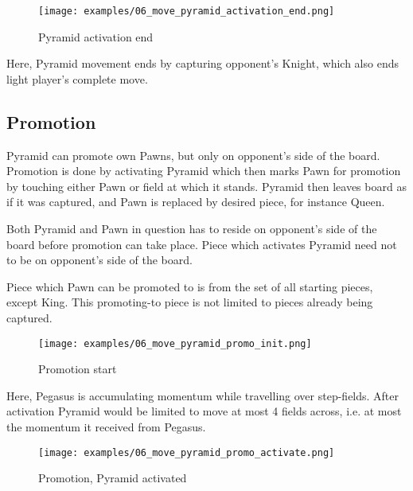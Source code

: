 \noindent
\begin{figure}[!h]
\texttt{[image: examples/06\_move\_pyramid\_activation\_end.png]}
\caption{Pyramid activation end}
\label{fig:ma_activation_end}
\end{figure}

Here, Pyramid movement ends by capturing opponent's Knight, which also ends light
player's complete move.

\clearpage %

\subsection*{Promotion}

Pyramid can promote own Pawns, but only on opponent's side of the board.
Promotion is done by activating Pyramid which then marks Pawn for promotion
by touching either Pawn or field at which it stands. Pyramid then leaves
board as if it was captured, and Pawn is replaced by desired piece, for
instance Queen.

Both Pyramid and Pawn in question has to reside on opponent's side of the
board before promotion can take place. Piece which activates Pyramid need
not to be on opponent's side of the board.

Piece which Pawn can be promoted to is from the set of all starting pieces,
except King. This promoting-to piece is not limited to pieces already being
captured.

\clearpage %

\noindent
\begin{figure}[!t]
\texttt{[image: examples/06\_move\_pyramid\_promo\_init.png]}
\caption{Promotion start}
\label{fig:ma_promo_init}
\end{figure}

Here, Pegasus is accumulating momentum while travelling over step-fields. After
activation Pyramid would be limited to move at most 4 fields across, i.e. at most
the momentum it received from Pegasus.

\clearpage %

\noindent
\begin{figure}[!t]
\texttt{[image: examples/06\_move\_pyramid\_promo\_activate.png]}
\caption{Promotion, Pyramid activated}
\label{fig:ma_promo_activate}
\end{figure}


